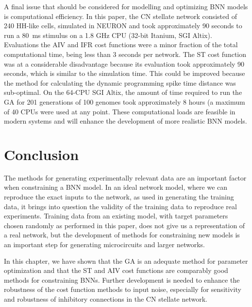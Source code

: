 \smallskip{}

A final issue that should be considered for modelling and optimizing BNN
models is computational efficiency. In this paper, the CN stellate network
consisted of 240 HH-like cells, simulated in NEURON and took approximately
90 seconds to run a 80~ms stimulus on a 1.8 GHz CPU (32-bit Itanium, SGI
Altix).  Evaluations the AIV and IFR cost functions were a minor fraction
of the total computational time, being less than 3 seconds per network. The
ST cost function was at a considerable disadvantage because its evaluation
took approximately 90 seconds, which is similar to the simulation
time. This could be improved because the method for calculating the dynamic
programming spike time distance was sub-optimal.  On the 64-CPU SGI Altix,
the amount of time required to run the GA for 201 generations of 100
genomes took approximately 8 hours (a maximum of 40 CPUs were used at any
point.  These computational loads are feasible in modern systems and will
enhance the development of more realistic BNN models.


\section{Conclusion}\label{sec:GA:conclusion}

The methods for generating experimentally relevant data are an important
factor when constraining a BNN model. In an ideal network model, where we
can reproduce the exact inputs to the network, as used in generating the
training data, it brings into question the validity of the training data to
reproduce real experiments.  Training data from an existing model, with
target parameters chosen randomly as performed in this paper, does not give
us a representation of a real network, but the development of methods for
constraining new models is an important step for generating microcircuits
and larger networks.

\smallskip{}

In this chapter, we have shown that the GA is an adequate method for
parameter optimization and that the ST and AIV cost functions are
comparably good methods for constraining BNNs. Further development is
needed to enhance the robustness of the cost function methods to input
noise, especially for sensitivity and robustness of inhibitory connections
in the CN stellate network.  


